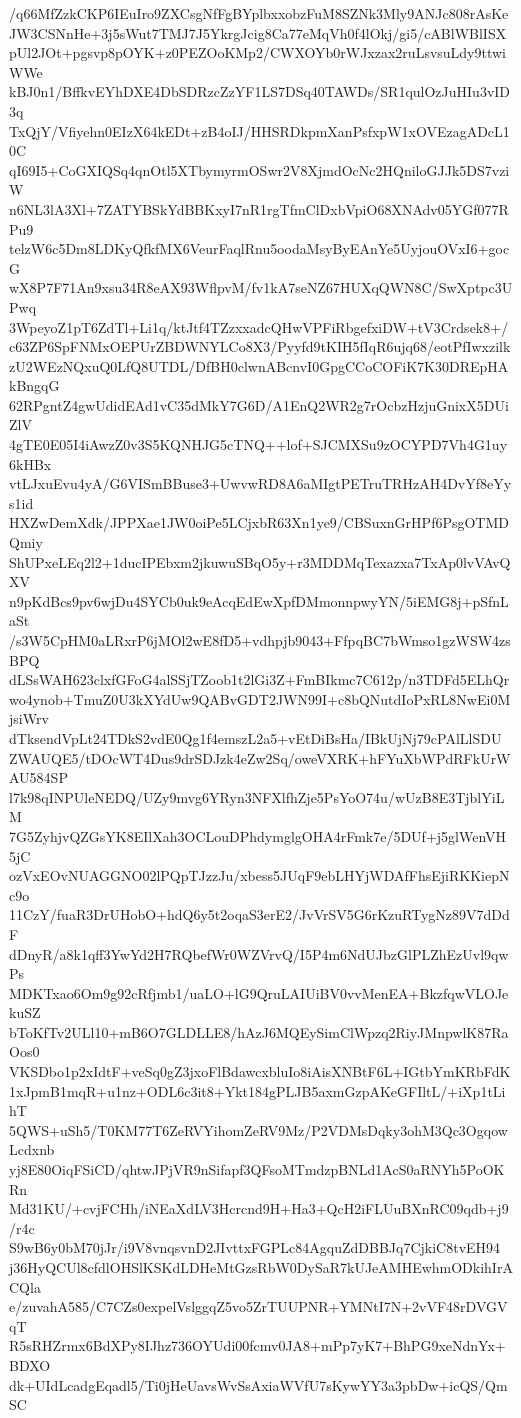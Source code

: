 /q66MfZzkCKP6IEuIro9ZXCsgNfFgBYplbxxobzFuM8SZNk3Mly9ANJc808rAsKe
JW3CSNnHe+3j5sWut7TMJ7J5YkrgJcig8Ca77eMqVh0f4lOkj/gi5/cABlWBlISX
pUl2JOt+pgsvp8pOYK+z0PEZOoKMp2/CWXOYb0rWJxzax2ruLsvsuLdy9ttwiWWe
kBJ0n1/BffkvEYhDXE4DbSDRzcZzYF1LS7DSq40TAWDs/SR1qulOzJuHIu3vID3q
TxQjY/Vfiyehn0EIzX64kEDt+zB4oIJ/HHSRDkpmXanPsfxpW1xOVEzagADcL10C
qI69I5+CoGXIQSq4qnOtl5XTbymyrmOSwr2V8XjmdOcNc2HQniloGJJk5DS7vziW
n6NL3lA3Xl+7ZATYBSkYdBBKxyI7nR1rgTfmClDxbVpiO68XNAdv05YGf077RPu9
telzW6c5Dm8LDKyQfkfMX6VeurFaqlRnu5oodaMsyByEAnYe5UyjouOVxI6+gocG
wX8P7F71An9xsu34R8eAX93WflpvM/fv1kA7seNZ67HUXqQWN8C/SwXptpc3UPwq
3WpeyoZ1pT6ZdTl+Li1q/ktJtf4TZzxxadcQHwVPFiRbgefxiDW+tV3Crdsek8+/
c63ZP6SpFNMxOEPUrZBDWNYLCo8X3/Pyyfd9tKIH5fIqR6ujq68/eotPfIwxzilk
zU2WEzNQxuQ0LfQ8UTDL/DfBH0clwnABcnvI0GpgCCoCOFiK7K30DREpHAkBngqG
62RPgntZ4gwUdidEAd1vC35dMkY7G6D/A1EnQ2WR2g7rOcbzHzjuGnixX5DUiZlV
4gTE0E05I4iAwzZ0v3S5KQNHJG5cTNQ++lof+SJCMXSu9zOCYPD7Vh4G1uy6kHBx
vtLJxuEvu4yA/G6VISmBBuse3+UwvwRD8A6aMIgtPETruTRHzAH4DvYf8eYys1id
HXZwDemXdk/JPPXae1JW0oiPe5LCjxbR63Xn1ye9/CBSuxnGrHPf6PsgOTMDQmiy
ShUPxeLEq2l2+1ducIPEbxm2jkuwuSBqO5y+r3MDDMqTexazxa7TxAp0lvVAvQXV
n9pKdBcs9pv6wjDu4SYCb0uk9eAcqEdEwXpfDMmonnpwyYN/5iEMG8j+pSfnLaSt
/s3W5CpHM0aLRxrP6jMOl2wE8fD5+vdhpjb9043+FfpqBC7bWmso1gzWSW4zsBPQ
dLSsWAH623clxfGFoG4alSSjTZoob1t2lGi3Z+FmBIkmc7C612p/n3TDFd5ELhQr
wo4ynob+TmuZ0U3kXYdUw9QABvGDT2JWN99I+c8bQNutdIoPxRL8NwEi0MjsiWrv
dTksendVpLt24TDkS2vdE0Qg1f4emszL2a5+vEtDiBsHa/IBkUjNj79cPAlLlSDU
ZWAUQE5/tDOcWT4Dus9drSDJzk4eZw2Sq/oweVXRK+hFYuXbWPdRFkUrWAU584SP
l7k98qINPUleNEDQ/UZy9mvg6YRyn3NFXlfhZje5PsYoO74u/wUzB8E3TjblYiLM
7G5ZyhjvQZGsYK8EIlXah3OCLouDPhdymglgOHA4rFmk7e/5DUf+j5glWenVH5jC
ozVxEOvNUAGGNO02lPQpTJzzJu/xbess5JUqF9ebLHYjWDAfFhsEjiRKKiepNc9o
11CzY/fuaR3DrUHobO+hdQ6y5t2oqaS3erE2/JvVrSV5G6rKzuRTygNz89V7dDdF
dDnyR/a8k1qff3YwYd2H7RQbefWr0WZVrvQ/I5P4m6NdUJbzGlPLZhEzUvl9qwPs
MDKTxao6Om9g92cRfjmb1/uaLO+lG9QruLAIUiBV0vvMenEA+BkzfqwVLOJekuSZ
bToKfTv2ULl10+mB6O7GLDLLE8/hAzJ6MQEySimClWpzq2RiyJMnpwlK87RaOos0
VKSDbo1p2xIdtF+veSq0gZ3jxoFlBdawcxbluIo8iAisXNBtF6L+IGtbYmKRbFdK
1xJpmB1mqR+u1nz+ODL6c3it8+Ykt184gPLJB5axmGzpAKeGFIltL/+iXp1tLihT
5QWS+uSh5/T0KM77T6ZeRVYihomZeRV9Mz/P2VDMsDqky3ohM3Qc3OgqowLcdxnb
yj8E80OiqFSiCD/qhtwJPjVR9nSifapf3QFsoMTmdzpBNLd1AcS0aRNYh5PoOKRn
Md31KU/+cvjFCHh/iNEaXdLV3Hcrcnd9H+Ha3+QcH2iFLUuBXnRC09qdb+j9/r4c
S9wB6y0bM70jJr/i9V8vnqsvnD2JIvttxFGPLc84AgquZdDBBJq7CjkiC8tvEH94
j36HyQCUl8cfdlOHSlKSKdLDHeMtGzsRbW0DySaR7kUJeAMHEwhmODkihIrACQla
e/zuvahA585/C7CZs0expelVslggqZ5vo5ZrTUUPNR+YMNtI7N+2vVF48rDVGVqT
R5sRHZrmx6BdXPy8IJhz736OYUdi00fcmv0JA8+mPp7yK7+BhPG9xeNdnYx+BDXO
dk+UIdLcadgEqadl5/Ti0jHeUavsWvSsAxiaWVfU7sKywYY3a3pbDw+icQS/QmSC
